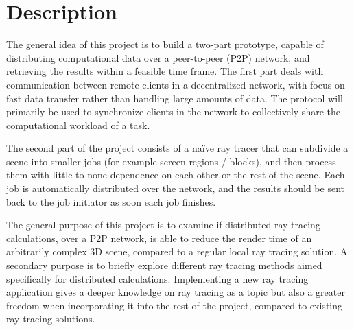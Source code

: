 \chapter{Description}


The general idea of this project is to build a two-part prototype, capable of distributing computational data over a peer-to-peer (P2P) network, and retrieving the results within a feasible time frame. The first part deals with communication between remote clients in a decentralized network, with focus on fast data transfer rather than handling large amounts of data. The protocol will primarily be used to synchronize clients in the network to collectively share the computational workload of a task. 

The second part of the project consists of a naïve ray tracer that can subdivide a scene into smaller jobs (for example screen regions / blocks), and then process them with little to none dependence on each other or the rest of the scene. Each job is automatically distributed over the network, and the results should be sent back to the job initiator as soon each job finishes.

The general purpose of this project is to examine if distributed ray tracing calculations, over a P2P network, is able to reduce the render time of an arbitrarily complex 3D scene, compared to a regular local ray tracing solution. A secondary purpose is to briefly explore different ray tracing methods aimed specifically for distributed calculations. Implementing a new ray tracing application gives a deeper knowledge on ray tracing as a topic but also a greater freedom when incorporating it into the rest of the project, compared to existing ray tracing solutions.

